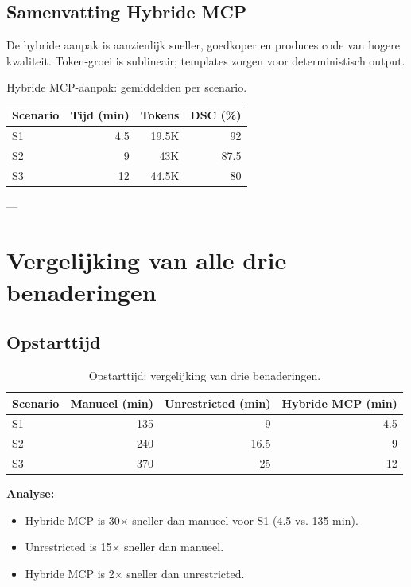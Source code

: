 \subsection{Samenvatting Hybride MCP}

De hybride aanpak is aanzienlijk sneller, goedkoper en produces code van hogere kwaliteit. Token-groei is sublineair; templates zorgen voor deterministisch output.

\begin{table}[h]
\small
\begin{tabularx}{\textwidth}{|l|r|r|r|}
\hline
\textbf{Scenario} & \textbf{Tijd (min)} & \textbf{Tokens} & \textbf{DSC (\%)} \\
\hline
S1 & 4.5 & 19.5K & 92 \\
S2 & 9 & 43K & 87.5 \\
S3 & 12 & 44.5K & 80 \\
\hline
\end{tabularx}
\caption{Hybride MCP-aanpak: gemiddelden per scenario.}
\label{tab:hybrid}
\end{table}

---

\section{Vergelijking van alle drie benaderingen}

\subsection{Opstarttijd}

\begin{table}[h]
\small
\begin{tabularx}{\textwidth}{|l|r|r|r|}
\hline
\textbf{Scenario} & \textbf{Manueel (min)} & \textbf{Unrestricted (min)} & \textbf{Hybride MCP (min)} \\
\hline
S1 & 135 & 9 & 4.5 \\
S2 & 240 & 16.5 & 9 \\
S3 & 370 & 25 & 12 \\
\hline
\end{tabularx}
\caption{Opstarttijd: vergelijking van drie benaderingen.}
\label{tab:time-comparison}
\end{table}

\noindent
\textbf{Analyse:}
\begin{itemize}
  \item Hybride MCP is 30× sneller dan manueel voor S1 (4.5 vs. 135 min).
  \item Unrestricted is 15× sneller dan manueel.
  \item Hybride MCP is 2× sneller dan unrestricted.
\end{itemize}

